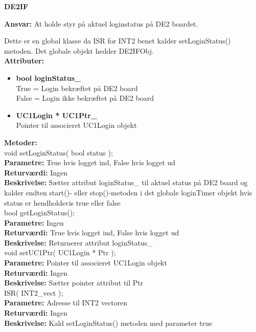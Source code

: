 %
%
{\centering
\textbf{DE2IF}\par
}
\textbf{Ansvar:} At holde styr på aktuel loginstatus på DE2 boardet.

Dette er en global klasse da ISR for INT2 benet kalder setLoginStatus() metoden. Det globale objekt hedder DE2IFObj. \\
\textbf{Attributer:}
\begin{itemize}
	\item \textbf{bool loginStatus\_} \\
	True = Login bekræftet på DE2 board \\
	False = Login ikke bekræftet på DE2 board
	\item \textbf{UC1Login * UC1Ptr\_} \\
	Pointer til associeret UC1Login objekt
\end{itemize}

\textbf{Metoder:} \\
void setLoginStatus( bool status ); \\
\textbf{Parametre:} True hvis logget ind, False hvis logget ud \\
\textbf{Returværdi:} Ingen \\
\textbf{Beskrivelse:} Sætter attribut loginStatus\_ til aktuel status på DE2 board og kalder endten start()- eller stop()-metoden i det globale loginTimer objekt hvis status er hendholdsvis true eller false \\

bool getLoginStatus(); \\
\textbf{Parametre:} Ingen \\
\textbf{Returværdi:} True hvis logget ind, False hvis logget ud \\
\textbf{Beskrivelse:} Returnerer attribut loginStatus\_ \\

void setUC1Ptr( UC1Login * Ptr ); \\
\textbf{Parametre:} Pointer til associeret UC1Login objekt \\
\textbf{Returværdi:} Ingen \\
\textbf{Beskrivelse:} Sætter pointer attribut til Ptr \\

ISR( INT2\_vect ); \\
\textbf{Parametre:} Adresse til INT2 vectoren \\
\textbf{Returværdi:} Ingen \\
\textbf{Beskrivelse:} Kald setLoginStatus() metoden med parameter true \\


